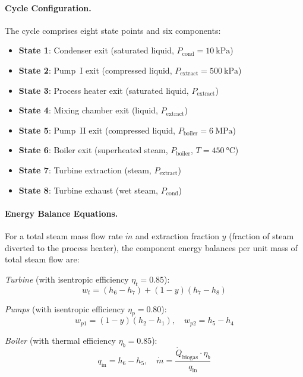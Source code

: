 \documentclass[12pt, letterpaper]{article}
\begin{document}
\paragraph{Cycle Configuration.}
The cycle comprises eight state points and six components:
\begin{itemize}[noitemsep]
  \item \textbf{State 1}: Condenser exit (saturated liquid, $P_\text{cond} = \SI{10}{\kilo\pascal}$)
  \item \textbf{State 2}: Pump~I exit (compressed liquid, $P_\text{extract} = \SI{500}{\kilo\pascal}$)
  \item \textbf{State 3}: Process heater exit (saturated liquid, $P_\text{extract}$)
  \item \textbf{State 4}: Mixing chamber exit (liquid, $P_\text{extract}$)
  \item \textbf{State 5}: Pump~II exit (compressed liquid, $P_\text{boiler} = \SI{6}{\mega\pascal}$)
  \item \textbf{State 6}: Boiler exit (superheated steam, $P_\text{boiler}$, $T = \SI{450}{\celsius}$)
  \item \textbf{State 7}: Turbine extraction (steam, $P_\text{extract}$)
  \item \textbf{State 8}: Turbine exhaust (wet steam, $P_\text{cond}$)
\end{itemize}

\paragraph{Energy Balance Equations.}
For a total steam mass flow rate $\dot{m}$ and extraction fraction $y$ (fraction of steam diverted to the process heater), the component energy balances per unit mass of total steam flow are:

\textit{Turbine} (with isentropic efficiency $\eta_t = 0.85$):
\begin{equation}
  w_t = (h_6 - h_7) + (1-y)(h_7 - h_8)
  \label{eq:w_turbine}
\end{equation}

\textit{Pumps} (with isentropic efficiency $\eta_p = 0.80$):
\begin{equation}
  w_{p1} = (1-y)(h_2 - h_1), \quad w_{p2} = h_5 - h_4
  \label{eq:w_pumps}
\end{equation}

\textit{Boiler} (with thermal efficiency $\eta_b = 0.85$):
\begin{equation}
  q_\text{in} = h_6 - h_5, \quad \dot{m} = \frac{\dot{Q}_\text{biogas} \cdot \eta_b}{q_\text{in}}
  \label{eq:q_boiler}
\end{equation}
\end{document}
